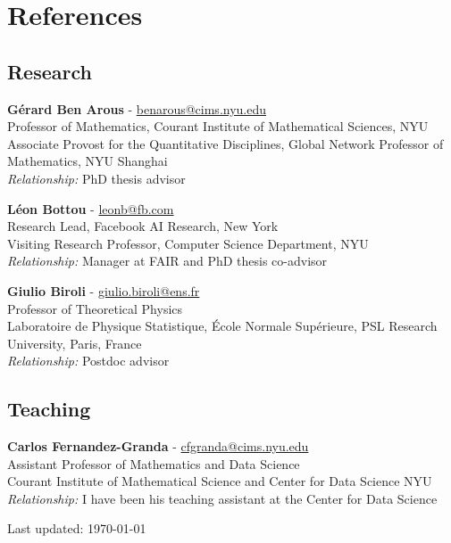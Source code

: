 \documentclass[10pt,letterpaper]{article}
\renewenvironment{itemize}
{
\begin{list}{}{\setlength{\leftmargin}{1.5em}}
}
{
  \end{list}
}
\begin{document}
\section*{References}

\subsection*{Research}

\begin{itemize}

\item \textbf{G\'erard Ben Arous} - \url{benarous@cims.nyu.edu} \\
Professor of Mathematics, Courant Institute of Mathematical Sciences, NYU \\
Associate Provost for the Quantitative Disciplines, Global Network Professor of Mathematics, NYU Shanghai \\
\textit{Relationship:} PhD thesis advisor

\item \textbf{L\'eon Bottou} - \url{leonb@fb.com} \\
Research Lead, Facebook AI Research, New York \\
Visiting Research Professor, Computer Science Department, NYU \\
\textit{Relationship:} Manager at FAIR and PhD thesis co-advisor

\item \textbf{Giulio Biroli} - \url{giulio.biroli@ens.fr} \\
Professor of Theoretical Physics \\
Laboratoire de Physique Statistique, \'Ecole Normale Sup\'erieure, PSL Research University, Paris, France \\
\textit{Relationship:} Postdoc advisor

\end{itemize}

\subsection*{Teaching}

\begin{itemize}

\item \textbf{Carlos Fernandez-Granda} - \url{cfgranda@cims.nyu.edu} \\
Assistant Professor of Mathematics and Data Science \\
Courant Institute of Mathematical Science and Center for Data Science NYU \\
\textit{Relationship:} I have been his teaching assistant at the Center for Data Science

\end{itemize}


\begin{center}
  \begin{footnotesize}
    Last updated: \today
  \end{footnotesize}
\end{center}
\end{document}
